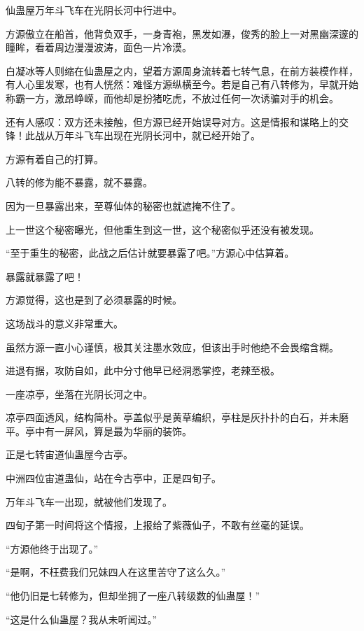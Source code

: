 
\begin{this_body}

仙蛊屋万年斗飞车在光阴长河中行进中。

方源傲立在船首，他背负双手，一身青袍，黑发如瀑，俊秀的脸上一对黑幽深邃的瞳眸，看着周边漫漫波涛，面色一片冷漠。

白凝冰等人则缩在仙蛊屋之内，望着方源周身流转着七转气息，在前方装模作样，有人心里发寒，也有人恍然：难怪方源纵横至今。若是自己有八转修为，早就开始称霸一方，激昂峥嵘，而他却是扮猪吃虎，不放过任何一次诱骗对手的机会。

还有人感叹：双方还未接触，但方源已经开始误导对方。这是情报和谋略上的交锋！此战从万年斗飞车出现在光阴长河中，就已经开始了。

方源有着自己的打算。

八转的修为能不暴露，就不暴露。

因为一旦暴露出来，至尊仙体的秘密也就遮掩不住了。

上一世这个秘密曝光，但他重生到这一世，这个秘密似乎还没有被发现。

“至于重生的秘密，此战之后估计就要暴露了吧。”方源心中估算着。

暴露就暴露了吧！

方源觉得，这也是到了必须暴露的时候。

这场战斗的意义非常重大。

虽然方源一直小心谨慎，极其关注墨水效应，但该出手时他绝不会畏缩含糊。

进退有据，攻防自如，此中分寸他早已经洞悉掌控，老辣至极。

一座凉亭，坐落在光阴长河之中。

凉亭四面透风，结构简朴。亭盖似乎是黄草编织，亭柱是灰扑扑的白石，并未磨平。亭中有一屏风，算是最为华丽的装饰。

正是七转宙道仙蛊屋今古亭。

中洲四位宙道蛊仙，站在今古亭中，正是四旬子。

万年斗飞车一出现，就被他们发现了。

四旬子第一时间将这个情报，上报给了紫薇仙子，不敢有丝毫的延误。

“方源他终于出现了。”

“是啊，不枉费我们兄妹四人在这里苦守了这么久。”

“他仍旧是七转修为，但却坐拥了一座八转级数的仙蛊屋！”

“这是什么仙蛊屋？我从未听闻过。”


\end{this_body}
